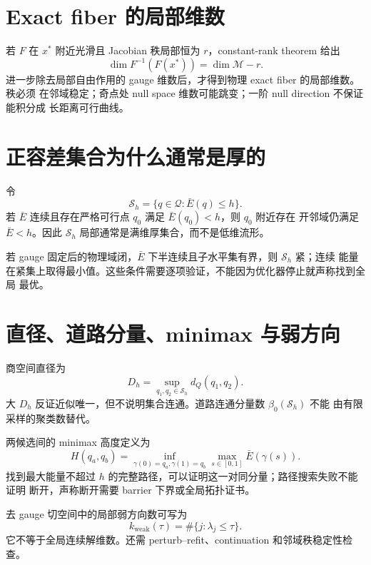 \documentclass[UTF8,a4paper,11pt]{ctexart}
\newcommand{\Sset}{\mathcal S}
\newcommand{\Mspace}{\mathcal M}
\newcommand{\Qspace}{\mathcal Q}
\begin{document}
\section{Exact fiber 的局部维数}

若 $F$ 在 $x^*$ 附近光滑且 Jacobian 秩局部恒为 $r$，constant-rank theorem
给出\citep{lee2013smooth}
\begin{equation}
  \dim F^{-1}(F(x^*))=\dim\Mspace-r.
\end{equation}
进一步除去局部自由作用的 gauge 维数后，才得到物理 exact fiber 的局部维数。秩必须
在邻域稳定；奇点处 null space 维数可能跳变；一阶 null direction 不保证能积分成
长距离可行曲线。

\section{正容差集合为什么通常是厚的}

令
\begin{equation}
  \Sset_h=\{q\in\Qspace:\bar E(q)\le h\}.
\end{equation}
若 $\bar E$ 连续且存在严格可行点 $q_0$ 满足 $\bar E(q_0)<h$，则 $q_0$ 附近存在
开邻域仍满足 $\bar E<h$。因此 $\Sset_h$ 局部通常是满维厚集合，而不是低维流形。

若 gauge 固定后的物理域闭，$\bar E$ 下半连续且子水平集有界，则 $\Sset_h$ 紧；连续
能量在紧集上取得最小值。这些条件需要逐项验证，不能因为优化器停止就声称找到全局
最优。

\section{直径、道路分量、minimax 与弱方向}

商空间直径为
\begin{equation}
  D_h=\sup_{q_1,q_2\in\Sset_h}d_Q(q_1,q_2).
\end{equation}
大 $D_h$ 反证近似唯一，但不说明集合连通。道路连通分量数 $\beta_0(\Sset_h)$ 不能
由有限采样的聚类数替代\citep{edelsbrunner2010computational}。

两候选间的 minimax 高度定义为
\begin{equation}
  H(q_a,q_b)=\inf_{\gamma(0)=q_a,\gamma(1)=q_b}
  \max_{s\in[0,1]}\bar E(\gamma(s)).
\end{equation}
找到最大能量不超过 $h$ 的完整路径，可以证明这一对同分量；路径搜索失败不能证明
断开，声称断开需要 barrier 下界或全局拓扑证书。

去 gauge 切空间中的局部弱方向数可写为
\begin{equation}
  k_{\mathrm{weak}}(\tau)=\#\{j:\lambda_j\le\tau\}.
\end{equation}
它不等于全局连续解维数。还需 perturb--refit、continuation 和邻域秩稳定性检查。
\end{document}
